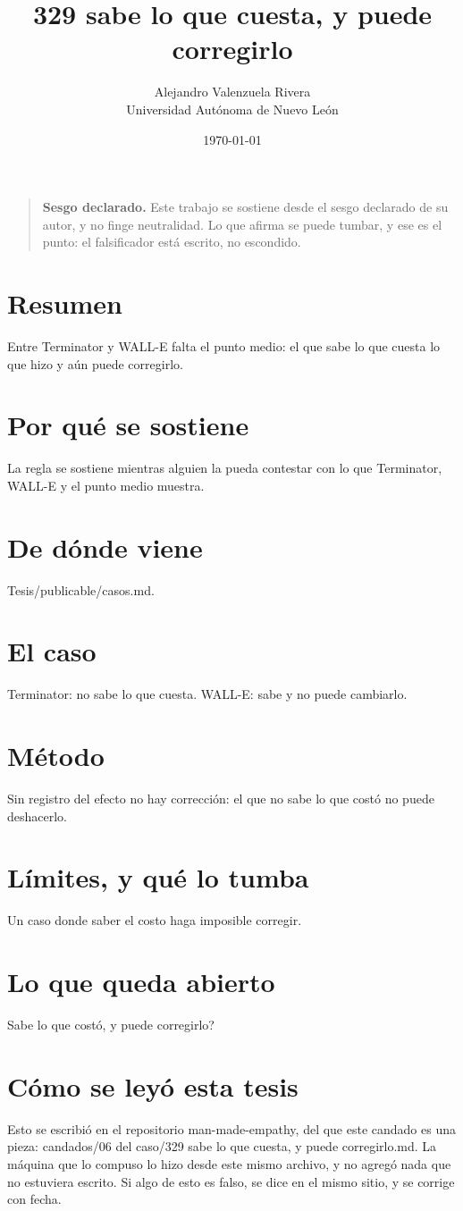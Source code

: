 \documentclass[11pt,a4paper]{article}
\title{329 sabe lo que cuesta, y puede corregirlo}
\author{Alejandro Valenzuela Rivera\\\small Universidad Autónoma de Nuevo León}
\date{\today}
\begin{document}
\maketitle

\begin{quote}
\textbf{Sesgo declarado.} Este trabajo se sostiene desde el sesgo declarado de su autor, y no finge neutralidad. Lo que afirma se puede tumbar, y ese es el punto: el falsificador está escrito, no escondido.
\end{quote}

\section*{Resumen}
Entre Terminator y WALL-E falta el punto medio: el que sabe lo que cuesta lo que hizo y aún puede corregirlo.

\section{Por qué se sostiene}
La regla se sostiene mientras alguien la pueda contestar con lo que Terminator, WALL-E y el punto medio muestra.

\section{De dónde viene}
Tesis/publicable/casos.md.

\section{El caso}
Terminator: no sabe lo que cuesta. WALL-E: sabe y no puede cambiarlo.

\section{Método}
Sin registro del efecto no hay corrección: el que no sabe lo que costó no puede deshacerlo.

\section{Límites, y qué lo tumba}
Un caso donde saber el costo haga imposible corregir.

\section{Lo que queda abierto}
\textquestiondown{}Sabe lo que costó, y puede corregirlo?

\section*{Cómo se leyó esta tesis}
Esto se escribió en el repositorio man-made-empathy, del que este candado es una pieza: candados/06 del caso/329 sabe lo que cuesta, y puede corregirlo.md. La máquina que lo compuso lo hizo desde este mismo archivo, y no agregó nada que no estuviera escrito. Si algo de esto es falso, se dice en el mismo sitio, y se corrige con fecha.
\end{document}
